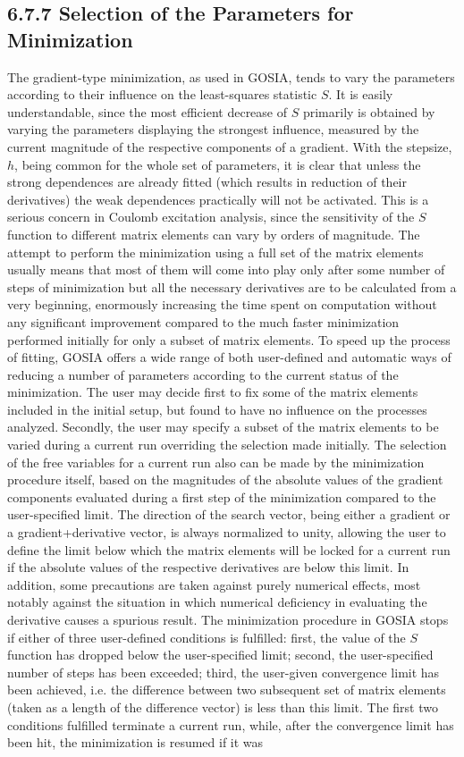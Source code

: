 \documentclass[10pt]{article}
\begin{document}
\subsection*{6.7.7 Selection of the Parameters for Minimization}
The gradient-type minimization, as used in GOSIA, tends to vary the parameters according to their influence on the least-squares statistic $S$. It is easily understandable, since the most efficient decrease of $S$ primarily is obtained by varying the parameters displaying the strongest influence, measured by the current magnitude of the respective components of a gradient. With the stepsize, $h$, being common for the whole set of parameters, it is clear that unless the strong dependences are already fitted (which results in reduction of their derivatives) the weak dependences practically will not be activated. This is a serious concern in Coulomb excitation analysis, since the sensitivity of the $S$ function to different matrix elements can vary by orders of magnitude. The attempt to perform the minimization using a full set of the matrix elements usually means that most of them will come into play only after some number of steps of minimization but all the necessary derivatives are to be calculated from a very beginning, enormously increasing the time spent on computation without any significant improvement compared to the much faster minimization performed initially for only a subset of matrix elements. To speed up the process of fitting, GOSIA offers a wide range of both user-defined and automatic ways of reducing a number of parameters according to the current status of the minimization. The user may decide first to fix some of the matrix elements included in the initial setup, but found to have no influence on the processes analyzed. Secondly, the user may specify a subset of the matrix elements to be varied during a current run overriding the selection made initially. The selection of the free variables for a current run also can be made by the minimization procedure itself, based on the magnitudes of the absolute values of the gradient components evaluated during a first step of the minimization compared to the user-specified limit. The direction of the search vector, being either a gradient or a gradient+derivative vector, is always normalized to unity, allowing the user to define the limit below which the matrix elements will be locked for a current run if the absolute values of the respective derivatives are below this limit. In addition, some precautions are taken against purely numerical effects, most notably against the situation in which numerical deficiency in evaluating the derivative causes a spurious result. The minimization procedure in GOSIA stops if either of three user-defined conditions is fulfilled: first, the value of the $S$ function has dropped below the user-specified limit; second, the user-specified number of steps has been exceeded; third, the user-given convergence limit has been achieved, i.e. the difference between two subsequent set of matrix elements (taken as a length of the difference vector) is less than this limit. The first two conditions fulfilled terminate a current run, while, after the convergence limit has been hit, the minimization is resumed if it was 
\end{document}
